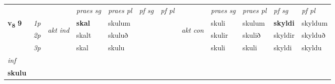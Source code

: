 \begin{longtable}[l]{X>{\footnotesize\itshape}llXXXXlXXXX}
\midrule

 & &   & \textit{praes sg}  & \textit{praes pl}    & \textit{ pf sg} & \textit{pf pl} & & \textit{praes sg}  & \textit{praes pl}    & \textit{pf sg} & \textit{pf pl }  \\ \cmidrule{4-7} \cmidrule{9-12}
 \multirow{2}{*}{{{\textbf{v{\textsubscript{8}}} \Large{\textbf{9}}}}}  & 1p & \multirow{3}{*}{\begin{turn}{90}\textit{akt ind}\end{turn}} & \textbf{skal} & skulum & \textbf{} & \textbf{} & \multirow{3}{*}{\begin{turn}{90}\textit{akt con}\end{turn}} &skuli & skulum & \textbf{skyldi} & skyldum\\*
 & 2p &  &  skalt  & skuluð &  &  & & skulir & skulið & skyldir & skylduð \\*
 & 3p &  & skal & skulu &  &  & & skuli & skuli& skyldi & skyldu \\*
\cmidrule{4-7} \cmidrule{9-12}
{ \textit{inf}} \\ { \textbf{skulu}} \\*

\bottomrule
\end{longtable}
